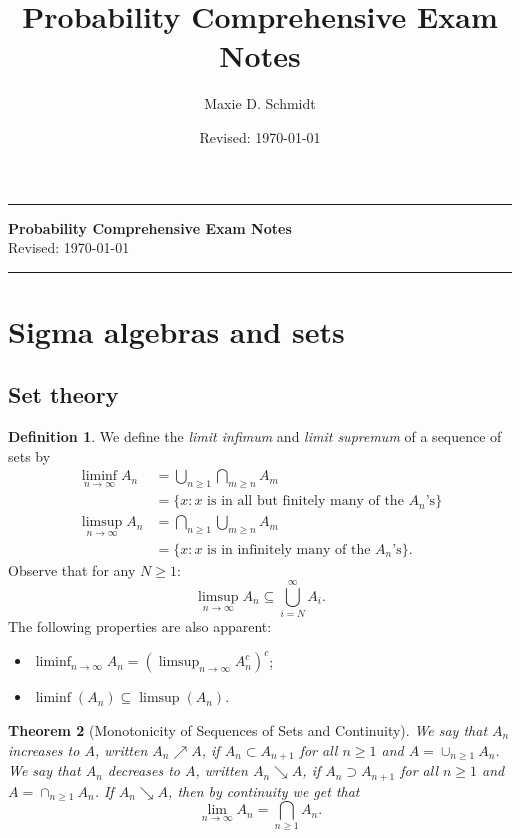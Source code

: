 \documentclass[12pt,reqno]{article}
\title{Probability Comprehensive Exam Notes}
\author{Maxie D. Schmidt}
\date{Revised: \today}
\renewcommand{\emph}[1]{\textit{#1}}
\theoremstyle{plain}
\newtheorem{theorem}{Theorem}[section]
\theoremstyle{definition}
\newtheorem{definition}[theorem]{Definition}
\begin{document}
\vskip -0.45in
\noindent 
\rule{\textwidth}{0.1cm} 

\begin{center} 
{\normalfont\sffamily\Large\bf Probability Comprehensive Exam Notes} \\[0.25cm]  
{\normalfont\sffamily\large Revised: \today}
\end{center}

\noindent 
\rule{\textwidth}{0.1cm} 

\vskip -0.75in
\def\contentsname{\large{Topics Index}}
\setcounter{secnumdepth}{2}
\renewcommand{\baselinestretch}{0.55}\normalsize
\tableofcontents
\renewcommand{\baselinestretch}{1.0}\normalsize

\newpage
\section{Sigma algebras and sets} 

\subsection{Set theory} 

\begin{definition} 
We define the \emph{limit infimum} and \emph{limit supremum} of a sequence of sets by 
\begin{align*} 
\liminf_{n \rightarrow \infty} A_n & = \bigcup_{n \geq 1} \bigcap_{m \geq n} 
     A_m \\ 
     & = \{x: \text{$x$ is in all but finitely many of the $A_n$'s}\} \\ 
\limsup_{n \rightarrow \infty} A_n & = \bigcap_{n \geq 1} \bigcup_{m \geq n} 
     A_m \\ 
     & = \{x: \text{$x$ is in infinitely many of the $A_n$'s}\}. 
\end{align*} 
Observe that for any $N \geq 1$:
$$\limsup_{n \rightarrow \infty} A_n \subseteq \bigcup_{i=N}^{\infty} A_i.$$
The following properties are also apparent:
\begin{itemize} 

\item $\liminf_{n \rightarrow \infty} A_n = 
       \left(\limsup_{n \rightarrow \infty} A_n^c\right)^c$; 
\item $\liminf(A_n) \subseteq \limsup(A_n)$. 

\end{itemize} 
\end{definition} 

\begin{theorem}[Monotonicity of Sequences of Sets and Continuity]
We say that \emph{$A_n$ increases to $A$}, written $A_n \nearrow A$, if 
$A_n \subset A_{n+1}$ for all $n \geq 1$ and $A = \cup_{n \geq 1} A_n$. 
We say that \emph{$A_n$ decreases to $A$}, written $A_n \searrow A$, 
if $A_n \supset A_{n+1}$ for all $n \geq 1$ and $A = \cap_{n \geq 1} A_n$. 
If $A_n \searrow A$, then by continuity we get that 
\[
\lim_{n \rightarrow \infty} A_n = \bigcap_{n \geq 1} A_n. 
\]
\end{theorem} 
\end{document}
